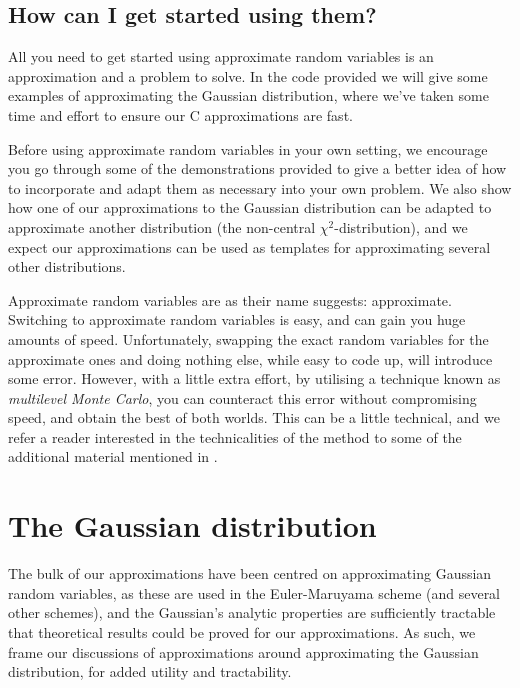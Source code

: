 \documentclass[11pt,a4paper,twoside,english]{extarticle}
\begin{document}
\subsection{How can I get started using them?}

All you need to get started using approximate random variables is an approximation and a problem to solve. In the code provided we will give some examples of approximating the Gaussian distribution, where we've taken some time and effort to ensure our C approximations are fast. 

Before using approximate random variables in your own setting, we encourage you go through some of the demonstrations provided to give a better idea of how to incorporate and adapt them as necessary into your own problem. We also show how one of our approximations to the Gaussian distribution can be adapted to approximate another distribution (the non-central $ \chi^2 $-distribution), and we expect our approximations can be used as templates for approximating several other distributions. 

Approximate random variables are as their name suggests: approximate. Switching to approximate random variables is easy, and can gain you huge amounts of speed. Unfortunately, swapping the exact random variables for the approximate ones and doing nothing else, while easy to code up, will introduce some error. However, with a little extra effort, by utilising a technique known as \emph{multilevel Monte Carlo}, you can counteract this error without compromising speed, and obtain the best of both worlds. This can be a little technical, and we refer a reader interested in the technicalities of the method to some of the additional material mentioned in .



\clearpage
\section{The Gaussian distribution}

The bulk of our approximations have been centred on approximating Gaussian random variables, as these are used in the Euler-Maruyama scheme (and several other schemes), and the Gaussian's analytic properties are sufficiently tractable that theoretical results could be proved for our approximations. As such, we frame our discussions of approximations around   approximating the Gaussian distribution, for added utility and tractability.
\end{document}
